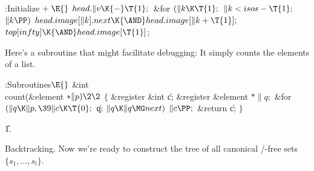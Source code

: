 \Y\B\4:Initialize\X${}\mathrel+\E{}$\6
$\\{head}.\|v\K{-}\T{1};{}$\6
\&{for} ${}(\|k\K\T{1};{}$ ${}\|k<\\{isos}-\T{1};{}$ ${}\|k\PP){}$\1\5
${}\\{head}.\\{image}[\|k].\\{next}\K{\AND}\\{head}.\\{image}[\|k+\T{1}];{}$\2\6
${}\\{top}[\\{infty}]\K{\AND}\\{head}.\\{image}[\T{1}]{}$;\par
\fi

Here's a subroutine that might facilitate debugging: It simply
counts the elements of a list.

\Y\B\4:Subroutines\X${}\E{}$\6
\1\1\&{int} \\{count}(\&{element} ${}{*}\|p)\2\2{}$\6
${}\{{}$\1\6
\&{register} \&{int} \|c;\6
\&{register} \&{element} ${}{*}\|q;{}$\7
\&{for} ${}(\|q\K\|p,\39\|c\K\T{0};{}$ \|q; ${}\|q\K\|q\MG\\{next}){}$\1\5
${}\|c\PP;{}$\2\6
\&{return} \|c;\6
\4${}\}{}$\2\par
\U1.\fi

Backtracking. Now we're ready to construct the tree of all canonical
\SET/-free sets $\{s_1,\ldots,s_l\}$.

